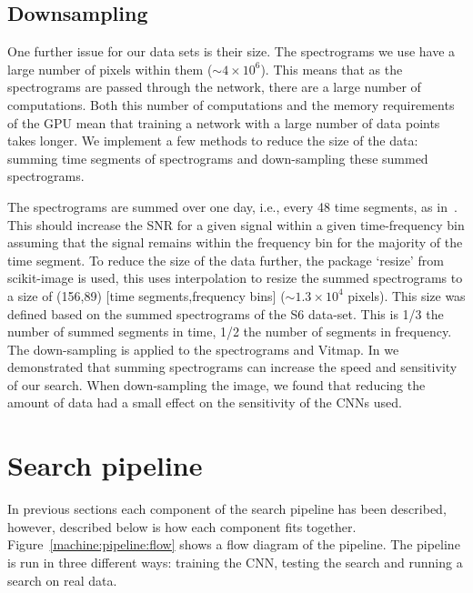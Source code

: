 \subsection{\label{machine:data:downsample} Downsampling}

%
One further issue for our data sets is their size. The spectrograms we use have a large number of pixels within them ($\sim 4 \times 10^{6}$).
This means that as the spectrograms are passed through the network, there are a large number of computations.
Both this number of computations and the memory requirements of the GPU mean that training a network with a large number of data points takes longer.
We implement a few methods to reduce the size of the data: summing time segments of
spectrograms and down-sampling these summed spectrograms.  

%
The spectrograms are summed over one day, i.e., every 48 time segments, as
in~\cite{bayley2019SOAPGeneralised}. This should increase the \gls{SNR} for a
given signal within a given time-frequency bin assuming that the
signal remains within the frequency bin for the majority of the time segment.
To reduce the size of the data further, the package `resize' from scikit-image
\cite{vanderwalt2014ScikitimageImage} is used, this uses interpolation to
resize the summed spectrograms to a size of (156,89) [time segments,frequency
bins] ($\sim 1.3 \times 10^{4}$ pixels). This size was defined based on the summed spectrograms of the S6 data-set. This is 1/3 the number of summed segments in time, 1/2 the number of segments in frequency. The down-sampling is applied to the
spectrograms and Vitmap. 
In \cite{bayley2019SOAPGeneralised} we demonstrated that summing spectrograms can increase the speed and sensitivity of our search.
When down-sampling the image, we found that reducing the amount of data had a small effect on the sensitivity of the \glspl{CNN} used.

\section{\label{machine:pipeline}Search pipeline}

%
In previous sections each component of the search pipeline has been described,
however, described below is how each component fits together.
Figure~\ref{machine:pipeline:flow} shows a flow diagram of the pipeline. The pipeline is
run in three different ways: training the \gls{CNN}, testing the search and
running a search on real data. 

